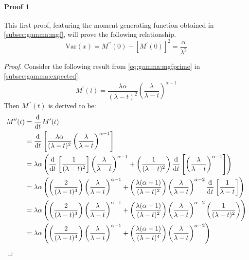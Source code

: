 \documentclass[12pt]{article}
\begin{document}
\paragraph{Proof 1}
This first proof, featuring the moment generating function obtained in \autoref{subsec:gamma:mgf}, will prove the
following relationship.
\begin{equation}\label{eq:gamma:var:proof1}
	\text{Var}(x) = M^{\prime\prime}(0) - [M^\prime(0)]^2 = \frac{\alpha}{\lambda^2}
\end{equation}
\begin{proof}
	Consider the following result from \autoref{eq:gamma:mgfprime} in \autoref{subsec:gamma:expected}:
	\begin{equation}
		M^\prime(t) = \frac{\lambda\alpha}{(\lambda - t)^2}\left(\frac{\lambda}{\lambda - t}\right)^{\alpha-1}
	\end{equation}
	Then $M^{\prime\prime}(t)$ is derived to be:\vspace*{-12pt}
	\begin{equation}
		\begin{split}
			M^{\prime\prime}(t)	&=	\mathop{}\!\frac{\mathrm{d}^{}}{\mathrm{d}t^{}}M^\prime(t)\\
								&=	\mathop{}\!\frac{\mathrm{d}^{}}{\mathrm{d}t^{}}\left[\frac{\lambda\alpha}{(\lambda - t)^2}\left(\frac{\lambda}{\lambda - t}\right)^{\alpha-1}\right]\\
								&=	\lambda\alpha\left(\mathop{}\!\frac{\mathrm{d}^{}}{\mathrm{d}t^{}}\left[\frac{1}{(\lambda - t)^2}\right]\left(\frac{\lambda}{\lambda - t}\right)^{\alpha-1} + \left(\frac{1}{(\lambda - t)^2}\right)\mathop{}\!\frac{\mathrm{d}^{}}{\mathrm{d}t^{}}\left[\left(\frac{\lambda}{\lambda - t}\right)^{\alpha-1}\right]\right)\\
								&=	\lambda\alpha\left(\left(\frac{2}{(\lambda-t)^3}\right)\left(\frac{\lambda}{\lambda - t}\right)^{\alpha-1} + \left(\frac{\lambda(\alpha-1)}{(\lambda - t)^2}\right)\left(\frac{\lambda}{\lambda-t}\right)^{\alpha-2}\mathop{}\!\frac{\mathrm{d}^{}}{\mathrm{d}t^{}}\left[\frac{1}{\lambda-t}\right]\right)\\
								&=	\lambda\alpha\left(\left(\frac{2}{(\lambda-t)^3}\right)\left(\frac{\lambda}{\lambda - t}\right)^{\alpha-1} + \left(\frac{\lambda(\alpha-1)}{(\lambda - t)^2}\right)\left(\frac{\lambda}{\lambda-t}\right)^{\alpha-2}\left(\frac{1}{(\lambda-t)^2}\right)\right)\\
								&=	\lambda\alpha\left(\left(\frac{2}{(\lambda-t)^3}\right)\left(\frac{\lambda}{\lambda - t}\right)^{\alpha-1} + \left(\frac{\lambda(\alpha-1)}{(\lambda - t)^4}\right)\left(\frac{\lambda}{\lambda-t}\right)^{\alpha-2}\right)
		\end{split}
	\end{equation}

\end{proof}
\end{document}
